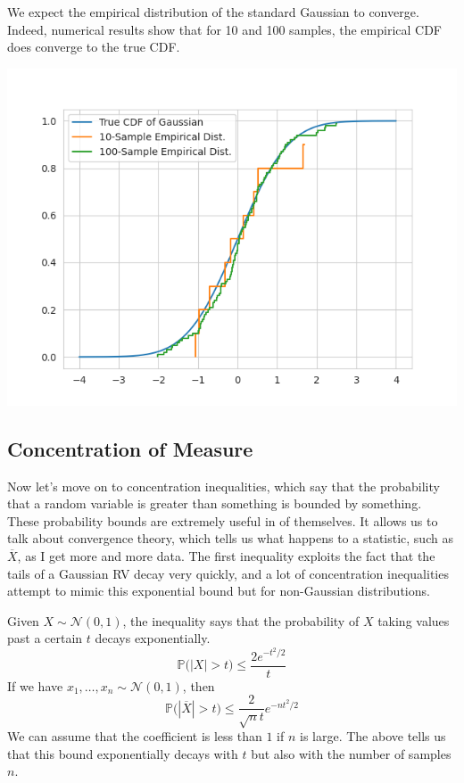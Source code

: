 \documentclass{article}
\begin{document}
    \begin{example}
      We expect the empirical distribution of the standard Gaussian to converge. Indeed, numerical results show that for 10 and 100 samples, the empirical CDF does converge to the true CDF. 

      \begin{center}
        \includegraphics[scale=0.4]{img/empirical_distribution.png}
      \end{center}
    \end{example}

  \subsection{Concentration of Measure}

    Now let's move on to concentration inequalities, which say that the probability that a random variable is greater than something is bounded by something. These probability bounds are extremely useful in of themselves. It allows us to talk about convergence theory, which tells us what happens to a statistic, such as $\overline{X}$, as I get more and more data. The first inequality exploits the fact that the tails of a Gaussian RV decay very quickly, and a lot of concentration inequalities attempt to mimic this exponential bound but for non-Gaussian distributions. 

    \begin{theorem}
    Given $X \sim \mathcal{N}(0, 1)$, the inequality says that the probability of $X$ taking values past a certain $t$ decays exponentially. 
    \[\mathbb{P} \big( |X| > t \big) \leq \frac{2 e^{-t^2/2}}{t}\]
    If we have $x_1, \ldots, x_n \sim \mathcal{N}(0, 1)$, then 
    \[\mathbb{P} \big( |\overline{X}| > t \big) \leq \frac{2}{\sqrt{n} t} e^{-n t^2/2}\]
    We can assume that the coefficient is less than $1$ if $n$ is large. The above tells us that this bound exponentially decays with $t$ but also with the number of samples $n$. 
    \end{theorem}
\end{document}
